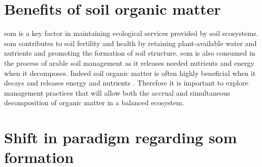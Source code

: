 
\section{Benefits of soil organic matter}


	\gls{som} is a key factor in maintaining ecological services provided by soil ecosystems.
	\gls{som} contributes to soil fertility and health by retaining plant-available water and nutrients and promoting the formation of soil structure. \gls{som} is also consumed in the process of arable soil management as it releases needed nutrients and energy when it decomposes. Indeed soil organic matter is often highly beneficial when it decays and releases energy and nutrients \citep{lehmann2015, janzen2006}. Therefore it is important to explore  management practices that will allow both the accrual and simultaneous  decomposition of organic matter in a balanced ecosystem.

\section{Shift in paradigm regarding \gls{som} formation}

